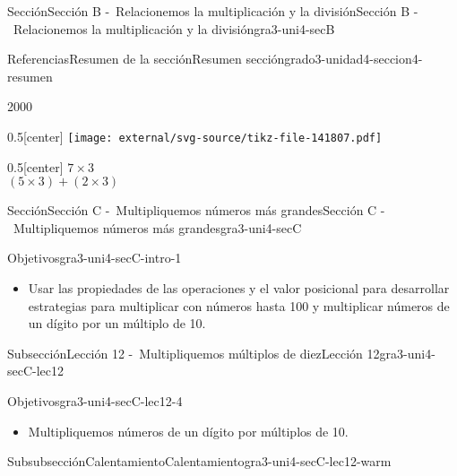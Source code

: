\documentclass[twoside,14pt,]{extarticle}
\begin{document}
\begin{sectionptx}{Sección}{Sección B -~Relacionemos la multiplicación y la división}{}{Sección B -~Relacionemos la multiplicación y la división}{}{}{gra3-uni4-secB}
\begin{references-subsection}{Referencias}{Resumen de la sección}{}{Resumen sección}{}{}{grado3-unidad4-seccion4-resumen}
\begin{sidebyside}{2}{0}{0}{0}
\begin{sbspanel}{0.5}[center]
\texttt{[image: external/svg-source/tikz-file-141807.pdf]}
\end{sbspanel}%
\begin{sbspanel}{0.5}[center]%
\(7\times 3\)\\
 \((5\times3)+(2\times3)\)%
\end{sbspanel}%
\end{sidebyside}%
\end{references-subsection}
\end{sectionptx}
%
%
\typeout{************************************************}
\typeout{************************************************}
%
\begin{sectionptx}{Sección}{Sección C -~Multipliquemos números más grandes}{}{Sección C -~Multipliquemos números más grandes}{}{}{gra3-uni4-secC}
\begin{introduction}{}%
\begin{objectives}{Objetivos}{gra3-uni4-secC-intro-1}
%
\begin{itemize}[label=\textbullet]
\item{}Usar las propiedades de las operaciones y el valor posicional para desarrollar estrategias para multiplicar con números hasta 100 y multiplicar números de un dígito por un múltiplo de 10.%
\end{itemize}
\end{objectives}
\end{introduction}%
%
%
\typeout{************************************************}
\typeout{************************************************}
%
\begin{subsectionptx}{Subsección}{Lección 12 -~Multipliquemos múltiplos de diez}{}{Lección 12}{}{}{gra3-uni4-secC-lec12}
\begin{objectives}{Objetivos}{gra3-uni4-secC-lec12-4}
%
\begin{itemize}[label=\textbullet]
\item{}Multipliquemos números de un dígito por múltiplos de 10.%
\end{itemize}
\end{objectives}
%
%
\typeout{************************************************}
\typeout{************************************************}
%
\begin{subsubsectionptx}{Subsubsección}{Calentamiento}{}{Calentamiento}{}{}{gra3-uni4-secC-lec12-warm}

\end{subsubsectionptx}
\end{subsectionptx}
\end{sectionptx}
\end{document}
